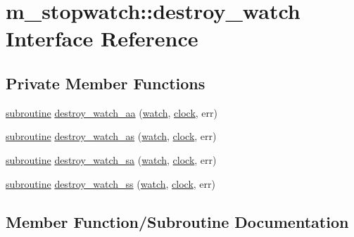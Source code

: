 \hypertarget{interfacem__stopwatch_1_1destroy__watch}{}\section{m\+\_\+stopwatch\+:\+:destroy\+\_\+watch Interface Reference}
\label{interfacem__stopwatch_1_1destroy__watch}
\subsection*{Private Member Functions}
\begin{DoxyCompactItemize}
\item 
\hyperlink{M__stopwatch_83_8txt_acfbcff50169d691ff02d4a123ed70482}{subroutine} \hyperlink{interfacem__stopwatch_1_1destroy__watch_a5c98a10d3cd478dcce108b738099705a}{destroy\+\_\+watch\+\_\+aa} (\hyperlink{read__watch_83_8txt_ad2129669fa47b8899641309620add095}{watch}, \hyperlink{stop__watch_83_8txt_a148c035b430d6edf5413dbd2704facfb}{clock}, err)
\item 
\hyperlink{M__stopwatch_83_8txt_acfbcff50169d691ff02d4a123ed70482}{subroutine} \hyperlink{interfacem__stopwatch_1_1destroy__watch_a59ee0996ec4bdb3fdf7845e980bc7e24}{destroy\+\_\+watch\+\_\+as} (\hyperlink{read__watch_83_8txt_ad2129669fa47b8899641309620add095}{watch}, \hyperlink{stop__watch_83_8txt_a148c035b430d6edf5413dbd2704facfb}{clock}, err)
\item 
\hyperlink{M__stopwatch_83_8txt_acfbcff50169d691ff02d4a123ed70482}{subroutine} \hyperlink{interfacem__stopwatch_1_1destroy__watch_a33ff16d3ef1c85dda77ee0d452329a60}{destroy\+\_\+watch\+\_\+sa} (\hyperlink{read__watch_83_8txt_ad2129669fa47b8899641309620add095}{watch}, \hyperlink{stop__watch_83_8txt_a148c035b430d6edf5413dbd2704facfb}{clock}, err)
\item 
\hyperlink{M__stopwatch_83_8txt_acfbcff50169d691ff02d4a123ed70482}{subroutine} \hyperlink{interfacem__stopwatch_1_1destroy__watch_a19a0c29a50d41adacaada8fb516aca2f}{destroy\+\_\+watch\+\_\+ss} (\hyperlink{read__watch_83_8txt_ad2129669fa47b8899641309620add095}{watch}, \hyperlink{stop__watch_83_8txt_a148c035b430d6edf5413dbd2704facfb}{clock}, err)
\end{DoxyCompactItemize}


\subsection{Member Function/\+Subroutine Documentation}
\mbox{\label{interfacem__stopwatch_1_1destroy__watch_a5c98a10d3cd478dcce108b738099705a}} 
